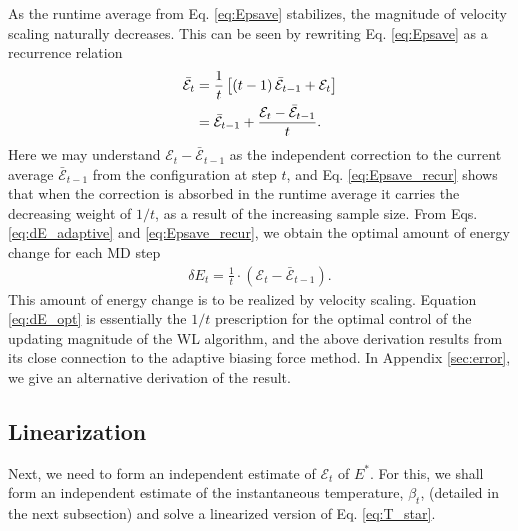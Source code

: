 \documentclass[reprint]{revtex4-1}
\begin{document}
As the runtime average from Eq. \eqref{eq:Epsave}
stabilizes, the magnitude of velocity scaling
naturally decreases.
%
This can be seen by rewriting Eq. \eqref{eq:Epsave}
as a recurrence relation
%
\begin{align}
  \bar{\mathcal E}_t
  &=
  \frac{1}{t}
  \left[
    (t - 1) \, \bar{\mathcal E}_{t - 1}
    + \mathcal E_t
  \right]
  \notag \\
  &=
  \bar{\mathcal E}_{t - 1}
  +
  \frac{
    \mathcal E_t - \bar{\mathcal E}_{t - 1}
  }
  {
    t
  }
  .
\label{eq:Epsave_recur}
\end{align}
%
Here we may understand $\mathcal E_t - \bar{\mathcal E}_{t - 1}$
as the independent correction
to the current average $\bar{\mathcal E}_{t - 1}$
from the configuration at step $t$,
and Eq. \eqref{eq:Epsave_recur} shows that
when the correction is absorbed in the runtime average
it carries the decreasing weight of $1/t$,
as a result of the increasing sample size.
%
From Eqs. \eqref{eq:dE_adaptive} and \eqref{eq:Epsave_recur},
we obtain the optimal amount of energy change
for each MD step
\begin{align}
  \delta E_t
  =
  \frac{ 1 } { t }
  \cdot
  \left( \mathcal E_t - \bar{\mathcal E}_{t - 1} \right)
  .
  \label{eq:dE_opt}
\end{align}
%
This amount of energy change is to be realized by velocity scaling.
%
Equation \eqref{eq:dE_opt} is essentially
the $1/t$ prescription\cite{
  belardinelli2007, *belardinelli2007jcp, *belardinelli2008,
  zhou2005, *zhou2008, *morozov2007}
for the optimal control of the updating magnitude
of the WL algorithm\cite{wang2001, *wang2001pre},
and the above derivation results from its close connection\cite{
  marsili2006, barducci2008}
to the adaptive biasing force method\cite{darve2001, *darve2008}.
%
In Appendix \ref{sec:error}, we give an alternative derivation of the result.



\subsection{Linearization}



Next, we need to form an independent estimate of
$\mathcal E_t$ of $E^*$.
%
For this, we shall form
an independent estimate of
the instantaneous temperature, $\beta_t$,
(detailed in the next subsection)
and solve a linearized version of Eq. \eqref{eq:T_star}.
\end{document}
